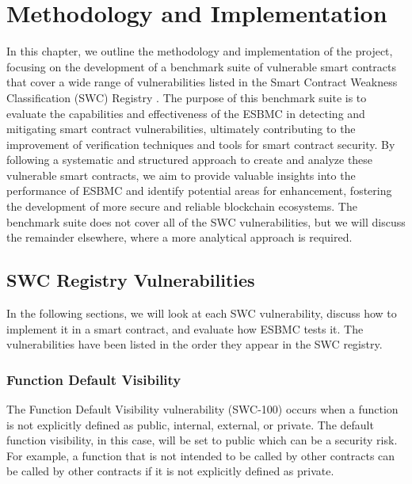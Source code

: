 \chapter{Methodology and Implementation}
\label{cha:methodology_and_implementation}

In this chapter, we outline the methodology and implementation of the project, focusing on the development of a benchmark suite of vulnerable smart contracts that cover a wide range of vulnerabilities listed in the Smart Contract Weakness Classification (SWC) Registry \cite{swc}. The purpose of this benchmark suite is to evaluate the capabilities and effectiveness of the ESBMC in detecting and mitigating smart contract vulnerabilities, ultimately contributing to the improvement of verification techniques and tools for smart contract security. By following a systematic and structured approach to create and analyze these vulnerable smart contracts, we aim to provide valuable insights into the performance of ESBMC and identify potential areas for enhancement, fostering the development of more secure and reliable blockchain ecosystems. The benchmark suite does not cover all of the SWC vulnerabilities, but we will discuss the remainder elsewhere, where a more analytical approach is required.


\section{SWC Registry Vulnerabilities}

In the following sections, we will look at each SWC vulnerability, discuss how to implement it in a smart contract, and evaluate how ESBMC tests it. The vulnerabilities have been listed in the order they appear in the SWC registry. 

\subsection{Function Default Visibility}
\label{sec:default_visibility}



The Function Default Visibility vulnerability (SWC-100) occurs when a function is not explicitly defined as public, internal, external, or private. The default function visibility, in this case, will be set to public which can be a security risk. For example, a function that is not intended to be called by other contracts can be called by other contracts if it is not explicitly defined as private.

